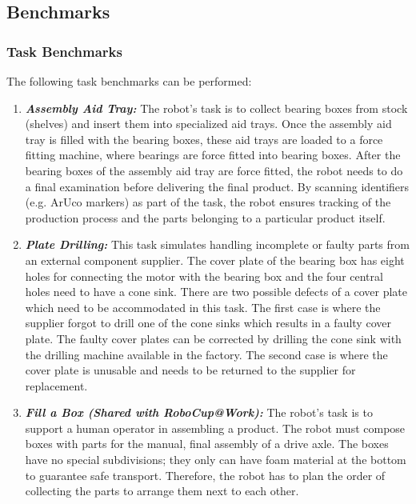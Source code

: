 \subsection{\erlir Benchmarks}
\label{ssec:nutshellroawtasks}


\subsubsection{Task Benchmarks}
\label{sssec:nutshellroawtasks}
The following task benchmarks can be performed:

\begin{enumerate}
	\item \textbf{\emph{Assembly Aid Tray:}} The robot's task is to collect bearing boxes from stock (shelves) and insert them into specialized aid trays. Once the assembly aid tray is filled with the bearing boxes, these aid trays are loaded to a force fitting machine, where bearings are force fitted into bearing boxes. After the bearing boxes of the assembly aid tray are force fitted, the robot needs to do a final examination before delivering the final product. By scanning identifiers (e.g. ArUco markers) as part of the task, the robot ensures tracking of the production process and the parts belonging to a particular product itself.

	\item \textbf{\emph{Plate Drilling:}} This task simulates handling incomplete or faulty parts from an external component supplier. 
	The cover plate of the bearing box has eight holes for connecting the motor with the bearing box and the four central holes need to have a cone sink. There are two possible defects of a cover plate which need to be accommodated in this task. The first case is where the supplier forgot to drill one of the cone sinks which results in a faulty cover plate. The faulty cover plates can be corrected by drilling the cone sink with the drilling machine available in the factory. The second case is where the cover plate is unusable and needs to be returned to the supplier for replacement.
	
	\item \textbf{\emph{Fill a Box (Shared with RoboCup@Work):}} The robot's task is to support a human operator in assembling a product.
	The robot must compose boxes with parts for the manual, final assembly of a drive axle. The boxes have no special subdivisions; they only can have foam material at the bottom to guarantee safe transport. Therefore, the robot has to plan the order of collecting the parts to arrange them next to each other.
\end{enumerate}


